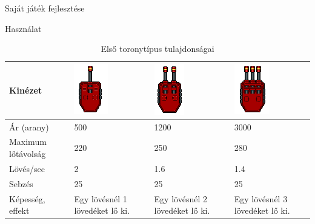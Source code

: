 \begin{MyChapter}{Saját játék fejlesztése}
\begin{MySection}{Használat}
		\begin{table}[H]
			\centering
			\caption{Első toronytípus tulajdonságai}
			\label{tab:torony_tipus_0}
			\begin{tabular}{|l|C{2.9cm}|C{2.9cm}|C{2.9cm}|}
				\hline
				Kinézet & \includegraphics[scale=0.76]{kepek/jatekHasznalat/torony_01} & \includegraphics[scale=0.76]{kepek/jatekHasznalat/torony_02} & \includegraphics[scale=0.76]{kepek/jatekHasznalat/torony_03} \\ \hline
				Ár (arany) & 500 & 1200 & 3000 \\ \hline
				Maximum lőtávolság & 220 & 250 & 280 \\ \hline
				Lövés/sec & 2 & 1.6 & 1.4 \\ \hline
				Sebzés & 25 & 25 & 25 \\ \hline
				Képesség, effekt & Egy lövésnél 1 lövedéket lő ki. & Egy lövésnél 2 lövedéket lő ki. & Egy lövésnél 3 lövedéket lő ki. \\ \hline
			\end{tabular}
		\end{table}
		

\end{MySection}
\end{MyChapter}

